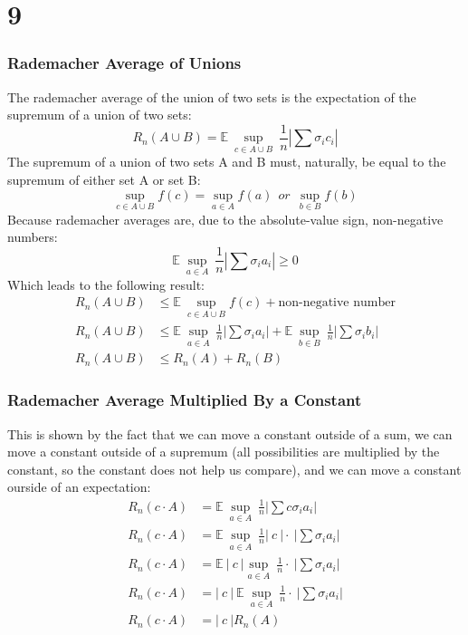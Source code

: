 \documentclass[a4paper,12pt]{article}
\begin{document}
\section*{9}

\subsubsection*{Rademacher Average of Unions}
The rademacher average of the union of two sets is the expectation of the supremum of a union of two sets:
$$
R_n(A \cup B) = \mathbb{E} \ \sup_{c \in A \cup B} \ \frac{1}{n} | \sum \sigma_i c_i |
$$
%
The supremum of a union of two sets A and B must, naturally, be equal to the supremum of either set A or set B:
$$
\sup_{c \in A \cup B} f(c) = \sup_{a \in A} f(a) \ \ or \ \  \sup_{b \in B} f(b)
$$
Because rademacher averages are, due to the absolute-value sign, non-negative numbers:
$$
\mathbb{E} \ \sup_{a \in A } \ \frac{1}{n} | \sum \sigma_i a_i | \geq 0
$$
Which leads to the following result:
\begin{align*}
R_n(A \cup B) &\leq \mathbb{E} \ \sup_{c \in A \cup B} f(c) + \text{non-negative number} \\
R_n(A \cup B) &\leq \mathbb{E} \ \sup_{a \in A } \ \frac{1}{n} | \sum \sigma_i a_i | + \mathbb{E} \ \sup_{b \in B} \ \frac{1}{n} | \sum \sigma_i b_i | \\
R_n(A \cup B) &\leq R_n(A) + R_n(B)
\end{align*}

\subsubsection*{Rademacher Average Multiplied By a Constant}
This is shown by the fact that we can move a constant outside of a sum, we can move a constant outside of a supremum (all possibilities are multiplied by the constant, so the constant does not help us compare), and we can move a constant ourside of an expectation:
\begin{align*}
R_n(c \cdot A) &= \mathbb{E} \ \sup_{a \in A} \ \frac{1}{n} | \sum c \sigma_i a_i | \\
R_n(c \cdot A) &= \mathbb{E} \ \sup_{a \in A} \ \frac{1}{n} | \ c \ | \cdot \ | \sum \sigma_i a_i | \\
R_n(c \cdot A) &= \mathbb{E} \ | \ c \ | \sup_{a \in A} \ \frac{1}{n} \cdot \ | \sum \sigma_i a_i | \\
R_n(c \cdot A) &= | \ c \ | \ \mathbb{E} \  \sup_{a \in A} \ \frac{1}{n} \cdot \ | \sum \sigma_i a_i | \\
R_n(c \cdot A) &= | \ c \ | R_n(A)
\end{align*}
\end{document}
